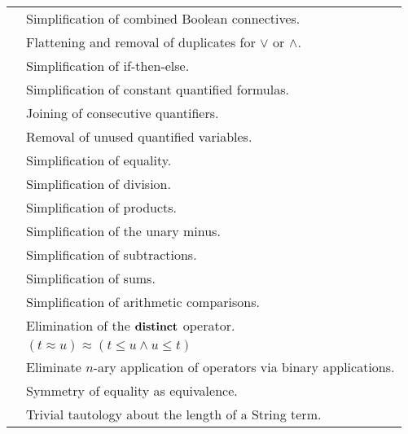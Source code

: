 \begin{xltabular}{\linewidth}{l X}
 & Simplification of combined Boolean connectives. \\
 & Flattening and removal of duplicates for $\lor$ or $\land$. \\
 & Simplification of if-then-else. \\
 & Simplification of constant quantified formulas. \\
 & Joining of consecutive quantifiers. \\
 & Removal of unused quantified variables. \\
 & Simplification of equality. \\
 & Simplification of division. \\
 & Simplification of products. \\
 & Simplification of the unary minus. \\
 & Simplification of subtractions. \\
 & Simplification of sums. \\
 & Simplification of arithmetic comparisons. \\
 & Elimination of the $\mathbf{distinct}$ operator. \\
 & $(t ≈ u) ≈ (t \leq u \land u \leq t)$ \\
 & Eliminate $n$-ary application of operators via binary applications. \\
 & Symmetry of equality as equivalence. \\
 & Trivial tautology about the length of a String term. \\
\end{xltabular}

